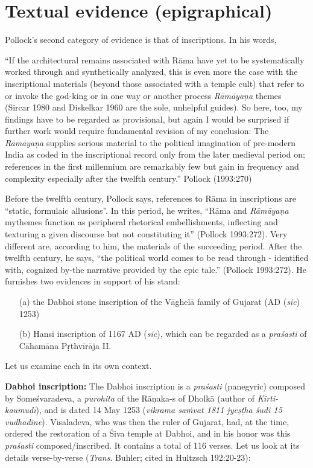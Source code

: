 \section{Textual evidence (epigraphical)}\label{sec3.2}

Pollock’s second category of evidence is that of inscriptions. In his words, 

\begin{myquote}
“If the architectural remains associated with Rāma have yet to be systematically worked through and synthetically analyzed, this is even more the case with the inscriptional materials (beyond those associated with a temple cult) that refer to or invoke the god-king or in one way or another process {\sl Rāmāyaṇa} themes (Sircar 1980 and Diskelkar 1960 are the sole, unhelpful guides). So here, too, my findings have to be regarded as provisional, but again I would be surprised if further work would require fundamental revision of my conclusion: The {\sl Rāmāyaṇa} supplies serious material to the political imagination of pre-modern India as coded in the inscriptional record only from the later medieval period on; references in the first millennium are remarkably few but gain in frequency and complexity especially after the twelfth century.”
\hfill Pollock (1993:270)
\end{myquote}

Before the twelfth century, Pollock says, references to Rāma in inscriptions are “static, formulaic allusions”. In this period, he writes, “Rāma and {\sl Rāmāyaṇa} mythemes function as peripheral rhetorical embellishments, inflecting and texturing a given discourse but not constituting it” (Pollock 1993:272). Very different are, according to him, the materials of the succeeding period. After the twelfth century, he says, “the political world comes to be read through - identified with, cognized by-the narrative provided by the epic tale.” (Pollock 1993:272). He furnishes two evidences in support of his stand: 
\begin{itemize}
\itemsep=0pt
\item[(a)] the Dabhoi stone inscription of the Vāghelā family of Gujarat (AD ({\sl sic}) 1253) 
\item[(b)] Hansi inscription of 1167 AD ({\sl sic}), which can be regarded as a {\sl praśasti} of Cāhamāna Pṛthvīrāja II. 
\end{itemize}
Let us examine each in its own context. 

\smallskip
\noindent
{\bf Dabhoi inscription:} The Dabhoi inscription is a {\sl praśasti} (panegyric) composed by Someśvaradeva, a {\sl purohita} of the Rāṇaka-s of Ḍholkā (author of {\sl Kīrti-kaumudī}), and is dated 14 May 1253 ({\sl vikrama saṁvat 1811 jyeṣṭha śudi 15 vudhadine}). Vīsaladeva, who was then the ruler of Gujarat, had, at the time, ordered the restoration of a Śiva temple at Dabhoi, and in his honor was this {\sl praśasti} composed/inscribed. It contains a total of 116 verses. Let us look at its details verse-by-verse ({\sl Trans}. Buhler; cited in Hultzsch 192:20-23):

